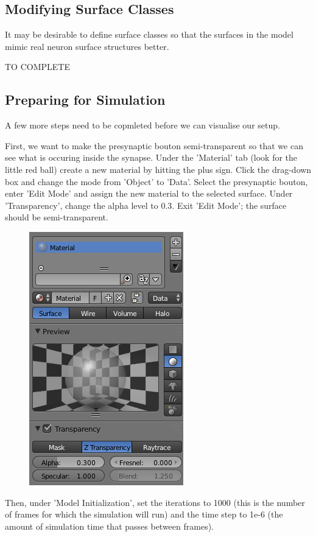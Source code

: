 \documentclass[twoside,a4paper]{refart}
\begin{document}
\subsection{Modifying Surface Classes}
It may be desirable to define surface classes so that the surfaces in the model mimic real neuron surface structures better. 

TO COMPLETE
    
\subsection{Preparing for Simulation}
A few more steps need to be copmleted before we can visualise our setup. 

First, we want to make the presynaptic bouton semi-transparent so that we can see what is occuring inside the synapse. Under the 'Material' tab (look for the little red ball) create a new material by hitting the plus sign. Click the drag-down box and change the mode from 'Object' to 'Data'. Select the presynaptic bouton, enter 'Edit Mode' and assign the new material to the selected surface. Under 'Transparency', change the alpha level to 0.3. Exit 'Edit Mode'; the surface should be semi-transparent.

    \begin{figure}[H]
        \includegraphics[scale=0.5]{settings3.png}
    \end{figure}

Then, under 'Model Initialization', set the iterations to 1000 (this is the number of frames for which the simulation will run) and the time step to 1e-6 (the amount of simulation time that passes between frames).
\end{document}
